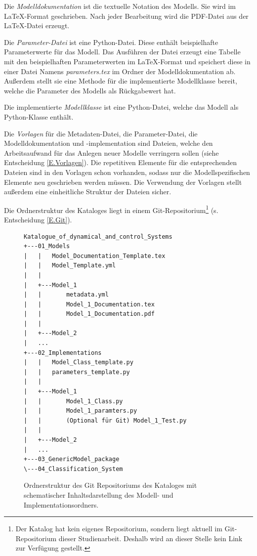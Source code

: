 Die \textit{Modelldokumentation} ist die textuelle Notation des Modells. Sie wird im \LaTeX-Format geschrieben. Nach jeder Bearbeitung wird die PDF-Datei aus der \LaTeX-Datei erzeugt. 

Die \textit{Parameter-Datei} ist eine Python-Datei. Diese enthält beispielhafte Parameterwerte für das Modell. Das Ausführen der Datei erzeugt eine Tabelle mit den beispielhaften Parameterwerten im \LaTeX-Format und speichert diese in einer Datei Namens \textit{parameters.tex} im Ordner der Modelldokumentation ab. Außerdem stellt sie eine Methode für die implementierte Modellklasse bereit, welche die Parameter des Modells als Rückgabewert hat.

Die implementierte \textit{Modellklasse} ist eine Python-Datei, welche das Modell als Python-Klasse enthält. 

Die \textit{Vorlagen} für die Metadaten-Datei, die Parameter-Datei, die Modelldokumentation und -implementation sind Dateien, welche den Arbeitsaufwand für das Anlegen neuer Modelle verringern sollen (siehe Entscheidung \ref{E.Vorlagen}). Die repetitiven Elemente für die entsprechenden Dateien sind in den Vorlagen schon vorhanden, sodass nur die Modellspezifischen Elemente neu geschrieben werden müssen. Die Verwendung der Vorlagen stellt außerdem eine einheitliche Struktur der Dateien sicher.

Die Ordnerstruktur des Kataloges liegt in einem Git-Repositorium\footnote{Der Katalog hat kein eigenes Repositorium, sondern liegt aktuell im Git-Repositorium dieser Studienarbeit. Deshalb wird an dieser Stelle kein Link zur Verfügung gestellt.} (s. Entscheidung \ref{E.Git}).  

\begin{figure}[H]
	\centering
	\begin{adjustbox}{max width=0.7\linewidth, padding=15pt 0pt 0pt 0pt, fbox}
		\begin{lstlisting}[basicstyle=\footnotesize, extendedchars=false]
Katalogue_of_dynamical_and_control_Systems
+---01_Models
|   |   Model_Documentation_Template.tex
|   |   Model_Template.yml 
|   |
|   +---Model_1
|   |       metadata.yml
|   |       Model_1_Documentation.tex
|   |       Model_1_Documentation.pdf	
|   |
|   +---Model_2
|   ...
+---02_Implementations
|   |   Model_Class_template.py
|   |   parameters_template.py
|   |             
|   +---Model_1
|   |       Model_1_Class.py
|   |       Model_1_paramters.py
|   |       (Optional für Git) Model_1_Test.py
|   |
|   +---Model_2
|   ...
+---03_GenericModel_package
\---04_Classification_System

		\end{lstlisting}
	\end{adjustbox}
	\caption[Ordnerstruktur des Kataloges]{Ordnerstruktur des Git Repositoriums des Kataloges mit schematischer Inhaltsdarstellung des Modell- und Implementationsordners.}
	\label{fig:Ordnerstruktur}
\end{figure}

